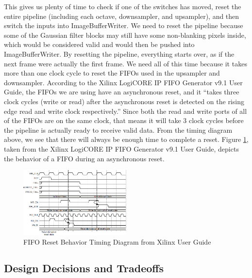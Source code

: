 This gives us plenty of time to check if one of the switches has moved, reset 
the entire pipeline (including each octave, downsampler, and upsampler), and 
then switch the inputs into ImageBufferWriter. We need to reset the pipeline 
because some of the Gaussian filter blocks may still have some non-blanking 
pixels inside, which would be considered valid and would then be pushed into 
ImageBufferWriter. By resetting the pipeline, everything starts over, as if the 
next frame were actually the first frame. We need all of this time because it 
takes more than one clock cycle to reset the FIFOs used in the upsampler and 
downsampler. According to the Xilinx LogiCORE IP FIFO Generator v9.1 User Guide, 
the FIFOs we are using have an asynchronous reset, and it ``takes three clock 
cycles (write or read) after the asynchronous reset is detected on the rising 
edge read and write clock respectively.'' Since both the read and write ports 
of all of the FIFOs are on the same clock, that means it will take 3 clock 
cycles before the pipeline is actually ready to receive valid data. From the 
timing diagram above, we see that there will always be enough time to complete 
a reset. Figure \ref{fig:fifo_timing}, taken from the Xilinx LogiCORE IP FIFO Generator 
v9.1 User Guide, depicts the behavior of a FIFO during an asynchronous reset.

\begin{figure}
    \includegraphics[width=0.5\textwidth]{processed_image_pngs/fifo_timing.png}
    \caption{FIFO Reset Behavior Timing Diagram from Xilinx User Guide}
    \label{fig:fifo_timing}
\end{figure}




\subsection{Design Decisions and Tradeoffs}


